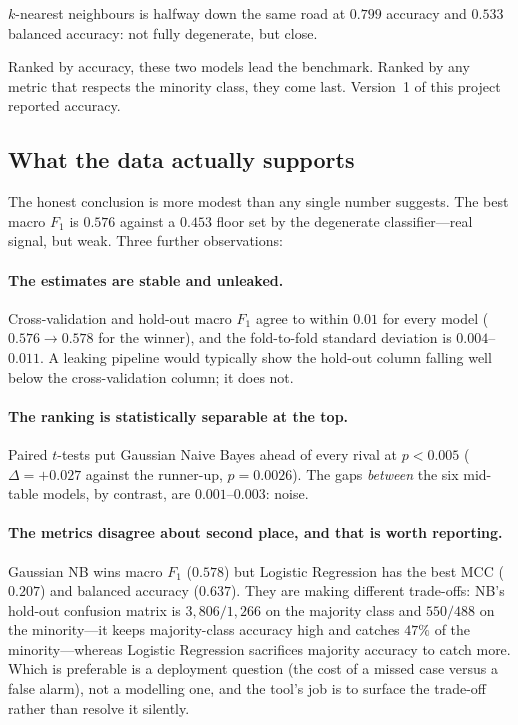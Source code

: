 \documentclass[11pt,a4paper]{article}
\begin{document}

$k$-nearest neighbours is halfway down the same road at $0.799$ accuracy and
$0.533$ balanced accuracy: not fully degenerate, but close.

Ranked by accuracy, these two models lead the benchmark. Ranked by any metric
that respects the minority class, they come last. Version~1 of this project
reported accuracy.

\subsection{What the data actually supports}

The honest conclusion is more modest than any single number suggests. The best
macro $F_1$ is $0.576$ against a $0.453$ floor set by the degenerate
classifier---real signal, but weak. Three further observations:

\paragraph{The estimates are stable and unleaked.} Cross-validation and
hold-out macro $F_1$ agree to within $0.01$ for every model ($0.576 \to 0.578$
for the winner), and the fold-to-fold standard deviation is $0.004$--$0.011$. A
leaking pipeline would typically show the hold-out column falling well below
the cross-validation column; it does not.

\paragraph{The ranking is statistically separable at the top.} Paired
$t$-tests put Gaussian Naive Bayes ahead of every rival at $p < 0.005$
($\Delta = +0.027$ against the runner-up, $p = 0.0026$). The gaps
\emph{between} the six mid-table models, by contrast, are $0.001$--$0.003$:
noise.

\paragraph{The metrics disagree about second place, and that is worth
reporting.} Gaussian NB wins macro $F_1$ ($0.578$) but Logistic Regression has
the best MCC ($0.207$) and balanced accuracy ($0.637$). They are making
different trade-offs: NB's hold-out confusion matrix is $3{,}806 / 1{,}266$ on
the majority class and $550 / 488$ on the minority---it keeps majority-class
accuracy high and catches $47\%$ of the minority---whereas Logistic Regression
sacrifices majority accuracy to catch more. Which is preferable is a deployment
question (the cost of a missed case versus a false alarm), not a modelling one,
and the tool's job is to surface the trade-off rather than resolve it silently.
\end{document}
